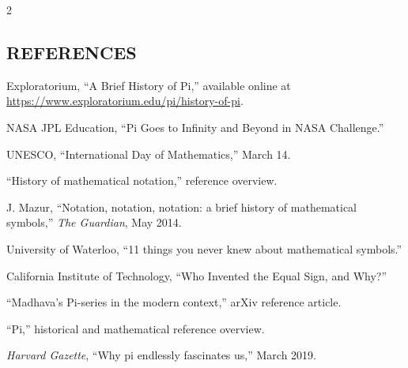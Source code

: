\begin{multicols}{2}
  \subsection*{\centering\uppercase{References}}
  {\small
  \begin{justify}
    \begin{enumerate}[label={\relax[\arabic*]},leftmargin=*,labelsep=0.5em,itemsep=0.20em,parsep=0pt]
      \item Exploratorium, “A Brief History of Pi,” available online at \url{https://www.exploratorium.edu/pi/history-of-pi}.
      \item NASA JPL Education, “Pi Goes to Infinity and Beyond in NASA Challenge.”
      \item UNESCO, “International Day of Mathematics,” March 14.
      \item “History of mathematical notation,” reference overview.
      \item J. Mazur, “Notation, notation, notation: a brief history of mathematical symbols,” \textit{The Guardian}, May 2014.
      \item University of Waterloo, “11 things you never knew about mathematical symbols.”
      \item California Institute of Technology, “Who Invented the Equal Sign, and Why?”
      \item “Madhava's Pi-series in the modern context,” arXiv reference article.
      \item “Pi,” historical and mathematical reference overview.
      \item \textit{Harvard Gazette}, “Why pi endlessly fascinates us,” March 2019.
    \end{enumerate}
  \end{justify}}

\end{multicols}

